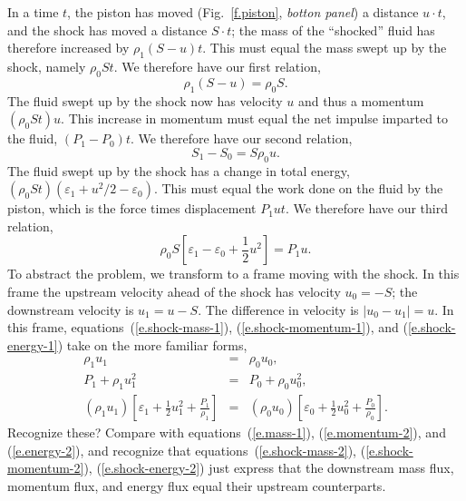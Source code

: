 In a time $t$, the piston has moved (Fig.~\ref{f.piston}, \emph{botton panel}) a distance $u\cdot t$, and the shock has moved a distance $S\cdot t$; the mass of the ``shocked'' fluid has therefore increased by $\rho_{1}(S-u)t$.  This must equal the mass swept up by the shock, namely $\rho_{0}St$.  We therefore have our first relation,
\begin{equation}\label{e.shock-mass-1}
\rho_{1}(S-u) = \rho_{0}S.
\end{equation}
The fluid swept up by the shock now has velocity $u$ and thus a momentum $(\rho_{0}St)u$. This increase in momentum must equal the net impulse imparted to the fluid, $(P_{1}-P_{0})t$.  We therefore have our second relation,
\begin{equation}\label{e.shock-momentum-1}
S_{1} - S_{0} = S\rho_{0}u.
\end{equation}
The fluid swept up by the shock has a change in total energy, $(\rho_{0}S t)(\varepsilon_{1} + u^{2}/2 -\varepsilon_{0})$. This must equal the work done on the fluid by the piston, which is the force times displacement $P_{1}ut$.  We therefore have our third relation,
\begin{equation}\label{e.shock-energy-1}
\rho_{0}S\left[\varepsilon_{1}-\varepsilon_{0} + \frac{1}{2}u^{2}\right] = P_{1}u.
\end{equation}
To abstract the problem, we transform to a frame moving with the shock.  In this frame the upstream velocity ahead of the shock has velocity $u_{0} = -S$; the downstream velocity is $u_{1} = u-S$.  The difference in velocity is $|u_{0} - u_{1}| = u$.
In this frame, equations~(\ref{e.shock-mass-1}), (\ref{e.shock-momentum-1}), and (\ref{e.shock-energy-1}) take on the more familiar forms,
\begin{eqnarray}
\rho_{1}u_{1} &=& \rho_{0}u_{0},\label{e.shock-mass-2}\\
P_{1} + \rho_{1}u_{1}^{2} &=& P_{0} + \rho_{0}u_{0}^{2},\label{e.shock-momentum-2}\\
(\rho_{1}u_{1})\left[\varepsilon_{1} + \frac{1}{2}u_{1}^{2} + \frac{P_{1}}{\rho_{1}}\right] &=& 
	(\rho_{0}u_{0})\left[\varepsilon_{0} + \frac{1}{2}u_{0}^{2} + \frac{P_{0}}{\rho_{0}}\right]. 
			\label{e.shock-energy-2}
\end{eqnarray}
Recognize these?  Compare with equations~(\ref{e.mass-1}), (\ref{e.momentum-2}), and (\ref{e.energy-2}), and recognize that equations~(\ref{e.shock-mass-2}), (\ref{e.shock-momentum-2}), (\ref{e.shock-energy-2}) just express that the downstream mass flux, momentum flux, and energy flux equal their upstream counterparts.

